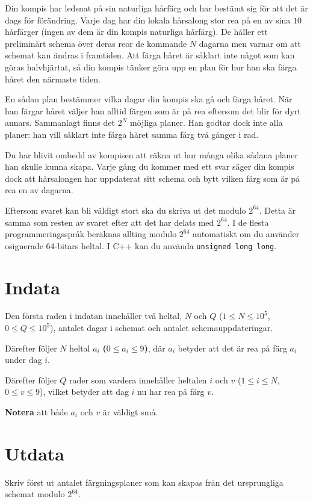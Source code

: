 \noindent

Din kompis har ledsnat på sin naturliga hårfärg och har bestämt sig för att det är dags för förändring.
Varje dag har din lokala hårsalong stor rea på en av sina $10$ hårfärger (ingen av dem
är din kompis naturliga hårfärg). De håller ett preliminärt schema över deras reor de kommande $N$
dagarna men varnar om att schemat kan ändras i framtiden. Att färga håret är såklart inte något som kan
göras halvhjärtat, så din kompis tänker göra upp en plan för hur han ska färga håret den närmaste tiden.

En sådan plan bestämmer vilka dagar din kompis ska gå och färga håret. När han färgar håret väljer han
alltid färgen som är på rea eftersom det blir för dyrt annars. Sammanlagt finns det
$2^N$ möjliga planer. Han godtar dock inte alla planer: han vill såklart inte färga håret samma färg två
gånger i rad.

Du har blivit ombedd av kompisen att räkna ut hur många olika sådana planer han skulle kunna skapa.
Varje gång du kommer med ett svar säger din kompis dock att hårsalongen har uppdaterat sitt schema
och bytt vilken färg som är på rea en av dagarna.

Eftersom svaret kan bli väldigt stort ska du skriva ut det modulo $2^{64}$. Detta är samma som
resten av svaret efter att det har delats med $2^{64}$. I de flesta programmeringsspråk
beräknas allting modulo $2^{64}$ automatiskt om du använder osignerade 64-bitars heltal.
I C++ kan du använda \texttt{unsigned long long}.

\section*{Indata}
Den första raden i indatan innehåller två heltal, $N$ och $Q$ ($1 \leq N \leq 10^5$, $0 \leq Q \leq 10^5$),
antalet dagar i schemat och antalet schemauppdateringar.

Därefter följer $N$ heltal $a_i$ \textbf{($0 \leq a_i \leq 9$)}, där $a_i$ betyder att det är rea på färg $a_i$
under dag $i$.

Därefter följer $Q$ rader som vardera innehåller heltalen $i$ och $v$ ($1 \leq i \leq N$, \textbf{$0 \leq v \leq 9$}),
vilket betyder att dag $i$ nu har rea på färg $v$.

\textbf{Notera} att både $a_i$ och $v$ är väldigt små.

\section*{Utdata}
Skriv först ut antalet färgningsplaner som kan skapas från det ursprungliga schemat modulo $2^{64}$.

